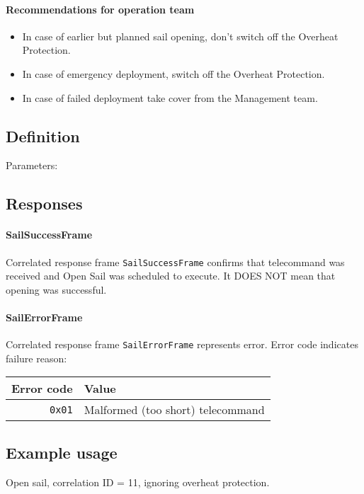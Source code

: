 \paragraph{Recommendations for operation team}
\begin{itemize}
    \item In case of earlier but planned sail opening, don't switch off the Overheat Protection.
	\item In case of emergency deployment, switch off the Overheat Protection.
	\item In case of failed deployment take cover from the Management team.
\end{itemize}


\subsection{Definition}

Parameters: 

\begin{tcarglist}
\end{tcarglist}


\subsection{Responses}

\paragraph{SailSuccessFrame}
Correlated response frame \texttt{SailSuccessFrame} confirms that telecommand was received and Open Sail was scheduled to execute. It DOES NOT mean that opening was successful. 

\paragraph{SailErrorFrame}
Correlated response frame \texttt{SailErrorFrame} represents error. Error code indicates failure reason:

\begin{tabular}{r | l}
	Error code & Value \\
	\hline
	\texttt{0x01} & Malformed (too short) telecommand \\
\end{tabular}

\subsection{Example usage}
Open sail, correlation ID = 11, ignoring overheat protection.

